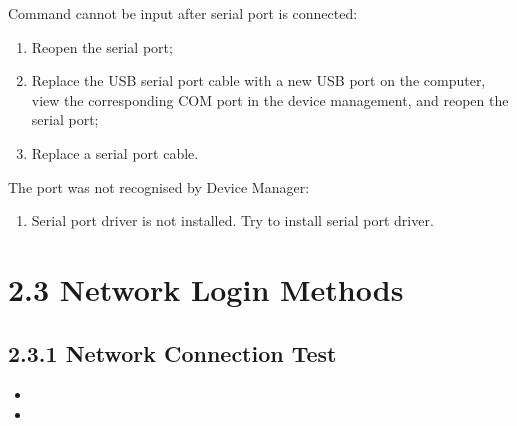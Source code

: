 \documentclass[letterpaper,10pt,openany,english]{sphinxmanual}
\begin{document}
\sphinxAtStartPar
{} Command cannot be input after serial port is connected:
\begin{enumerate}
%
\item {} 
\sphinxAtStartPar
Re\sphinxhyphen{}open the serial port;

\item {} 
\sphinxAtStartPar
Replace the USB serial port cable with a new USB port on the computer, view the corresponding COM port in the device management, and reopen the serial port;

\item {} 
\sphinxAtStartPar
Replace a serial port cable.

\end{enumerate}

\sphinxAtStartPar
{} The port was not recognised by Device Manager:
\begin{enumerate}
%
\item {} 
\sphinxAtStartPar
Serial port driver is not installed. Try to install serial port driver.

\end{enumerate}


\section{2.3 Network Login Methods}
\label{\detokenize{linux-manual:network-login-methods}}

\subsection{2.3.1 Network Connection Test}
\label{\detokenize{linux-manual:network-connection-test}}
\sphinxAtStartPar
{}
\begin{itemize}
\item {} 
\sphinxAtStartPar
{}

\item {} 
\sphinxAtStartPar
{}

\end{itemize}
\end{document}
